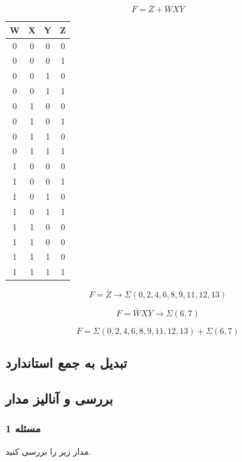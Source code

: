 \documentclass[20pt, a4paper]{article}
\begin{document}
\begin{equation}
	F = \bar{Z} + \bar{W}XY
\end{equation}

\begin{LTR}
	\begin{tabular}{ c c c c}
		W & X & Y & Z \\
		\hline
		0 & 0 & 0 & 0\\
		0 & 0 & 0 & 1\\
		0 & 0 & 1 & 0\\
		0 & 0 & 1 & 1\\
	 	0 & 1 & 0 & 0\\
		0 & 1 & 0 & 1\\
		0 & 1 & 1 & 0\\
		0 & 1 & 1 & 1\\
		1 & 0 & 0 & 0\\
		1 & 0 & 0 & 1\\
		1 & 0 & 1 & 0\\
		1 & 0 & 1 & 1\\
		1 & 1 & 0 & 0\\
		1 & 1 & 0 & 0\\
		1 & 1 & 1 & 0\\
		1 & 1 & 1 & 1
	\end{tabular}
\end{LTR}
\hfill \break

\begin{equation}
	F = \bar{Z} \rightarrow{\Sigma(0, 2, 4, 6, 8, 9, 11, 12, 13)}
\end{equation}

\begin{equation}
	F = \bar{W}XY \rightarrow{\Sigma(6, 7)}
\end{equation}

\begin{equation}
	F = \Sigma(0, 2, 4, 6, 8, 9, 11, 12, 13) + \Sigma(6, 7)
\end{equation}
\newpage

\subsection{تبديل به جمع استاندارد}
\newpage


\subsection{بررسی و آنالیز مدار}
\subsubsection{مسئله 1}
مدار زیر را بررسی کنید. 
\end{document}
